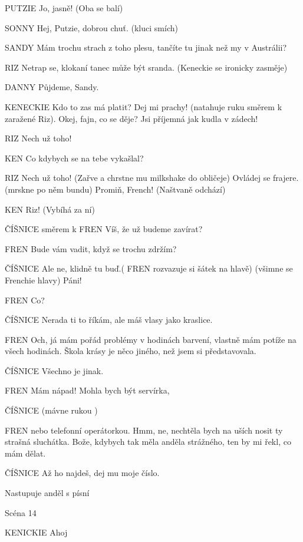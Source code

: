 PUTZIE         Jo, jasně! (Oba se balí) 

SONNY        Hej, Putzie, dobrou chuť. (kluci smích)

SANDY        Mám trochu strach z toho plesu, tančíte tu jinak než my v Austrálii? 

RIZ                Netrap se, klokaní tanec může být sranda. (Keneckie se ironicky                 zasměje) 

DANNY        Půjdeme, Sandy. 

KENECKIE        Kdo to zas má platit? Dej mi prachy! (natahuje ruku směrem k zaražené         Riz). Okej, fajn, co se děje? Jsi příjemná jak kudla v zádech! 

RIZ                Nech už toho! 

KEN        Co kdybych se na tebe vykašlal? 

RIZ                Nech už toho! (Zařve a chrstne mu milkshake do obličeje) Ovládej se         frajere. (mrskne po něm bundu) Promiň, French! (Naštvaně odchází)

KEN         Riz! (Vybíhá za ní) 

ČÍŠNICE          směrem k FREN  Víš, že už budeme zavírat? 

FREN        Bude vám vadit, když se trochu zdržím?

ČÍŠNICE         Ale ne, klidně tu buď.( FREN rozvazuje si šátek na hlavě) (všimne se         Frenchie hlavy) Páni! 

FREN        Co? 

ČÍŠNICE        Nerada ti to říkám, ale máš vlasy jako kraslice. 

FREN        Och, já mám pořád problémy v hodinách barvení, vlastně mám potíže         na všech hodinách. Škola krásy je něco jiného, než jsem si                         představovala. 

ČÍŠNICE         Všechno je jinak.

FREN        Mám nápad! Mohla bych být servírka,

ČÍŠNICE        (mávne rukou ) 

FREN        nebo telefonní operátorkou. Hmm, ne, nechtěla bych na uších nosit ty         strašná sluchátka. Bože, kdybych tak měla anděla strážného, ten by mi         řekl, co mám dělat. 

ČÍŠNICE         Až ho najdeš, dej mu moje číslo. 

Nastupuje anděl s písní 

Scéna 14 

KENICKIE                 Ahoj

